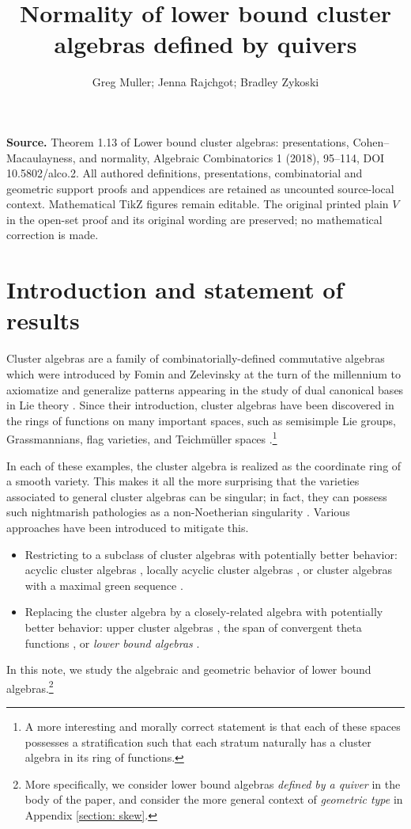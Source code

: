 \documentclass[10pt]{amsart}
\title{Normality of lower bound cluster algebras defined by quivers}
\author{Greg Muller; Jenna Rajchgot; Bradley Zykoski}
\date{}
\numberwithin{equation}{section}
\theoremstyle{definition}
\theoremstyle{remark}
\newcommand{\1}{^{-1}}
\begin{document}
\maketitle
\noindent\textbf{Source.} Theorem 1.13 of Lower bound cluster algebras: presentations, Cohen--Macaulayness, and normality, Algebraic Combinatorics 1 (2018), 95--114, DOI 10.5802/alco.2. All authored definitions, presentations, combinatorial and geometric support proofs and appendices are retained as uncounted source-local context. Mathematical TikZ figures remain editable. The original printed plain $V$ in the open-set proof and its original wording are preserved; no mathematical correction is made.
\section{Introduction and statement of results}

Cluster algebras are a family of combinatorially-defined commutative algebras which were introduced by Fomin and Zelevinsky at the turn of the millennium to axiomatize and generalize patterns appearing in the study of dual canonical bases in Lie theory \cite{FZ02}.  Since their introduction, cluster algebras have been discovered in the rings of functions on many important spaces, such as semisimple Lie groups, Grassmannians, flag varieties, and Teichm\"uller spaces \cite{BFZ05,Sco06,GLS08,GSV05}.\footnote{A more interesting and morally correct statement is that each of these spaces possesses a stratification such that each stratum naturally has a cluster algebra in its ring of functions.}

In each of these examples, the cluster algebra is realized as the coordinate ring of a smooth variety.  This makes it all the more surprising that the varieties associated to general cluster algebras can be singular; in fact, they can possess such nightmarish pathologies as a non-Noetherian singularity \cite{MulLA}.  Various approaches have been introduced to mitigate this. %

\begin{itemize}
	\item Restricting to a subclass of cluster algebras with potentially better behavior: acyclic cluster algebras \cite{BFZ05}, locally acyclic cluster algebras \cite{MulLA,BMRS15}, or cluster algebras with a maximal green sequence \cite{BDP14,MulMGS}.
	\item Replacing the cluster algebra by a closely-related algebra with potentially better behavior: upper cluster algebras \cite{BFZ05,BMRS15}, the span of convergent theta functions \cite{GHKK}, or \textit{lower bound algebras} \cite{BFZ05}.
\end{itemize}
In this note, we study the algebraic and geometric behavior of lower bound algebras.\footnote{More specifically, we consider lower bound algebras \emph{defined by a quiver} in the body of the paper, and consider the more general context of \emph{geometric type} in Appendix \ref{section: skew}.}
\end{document}
